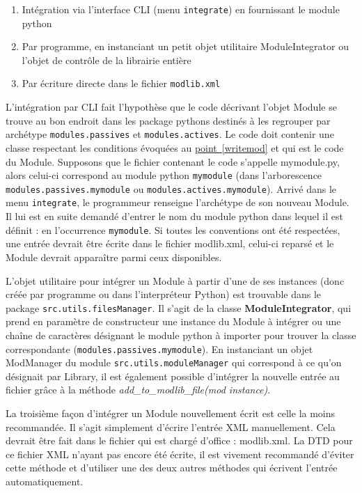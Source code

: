 \documentclass[]{article}
\newcommand{\wordlink}[2]{\hyperref[#1]{#2~\ref{#1}}}
\begin{document}
\begin{enumerate}
\item Intégration via l'interface CLI (menu \texttt{integrate}) en fournissant le module python
\item Par programme, en instanciant un petit objet utilitaire ModuleIntegrator ou l'objet de contrôle de la librairie entière
\item Par écriture directe dans le fichier \texttt{modlib.xml}
\end{enumerate}

\par L'intégration par CLI fait l'hypothèse que le code décrivant l'objet Module se trouve au bon endroit dans les package pythons destinés à les regrouper par archétype \texttt{modules.passives} et \texttt{modules.actives}. Le code doit contenir une classe respectant les conditions évoquées au \wordlink{writemod}{point} et qui est le code du Module. Supposons que le fichier contenant le code s'appelle mymodule.py, alors celui-ci correspond au module python \texttt{mymodule} (dans l'arborescence \texttt{modules.passives.mymodule} ou \texttt{modules.actives.mymodule}). Arrivé dans le menu \texttt{integrate}, le programmeur renseigne l'archétype de son nouveau Module. Il lui est en suite demandé d'entrer le nom du module python dans lequel il est définit : en l'occurrence \texttt{mymodule}. Si toutes les conventions ont été respectées, une entrée devrait être écrite dans le fichier modlib.xml, celui-ci reparsé et le Module devrait apparaître parmi ceux disponibles.\\

\par L'objet utilitaire pour intégrer un Module à partir d'une de ses instances (donc créée par programme ou dans l'interpréteur Python) est trouvable dans le package \texttt{src.utils.filesManager}. Il s'agit de la classe \textbf{ModuleIntegrator}, qui prend en paramètre de constructeur une instance du Module à intégrer ou une chaîne de caractères désignant le module python à importer pour trouver la classe correspondante (\texttt{modules.passives.mymodule}). En instanciant un objet ModManager du module \texttt{src.utils.moduleManager} qui correspond à ce qu'on désignait par Library, il est également possible d'intégrer la nouvelle entrée au fichier grâce à la méthode \textit{add\_to\_modlib\_file(mod instance)}.\\

\par La troisième façon d'intégrer un Module nouvellement écrit est celle la moins recommandée. Il s'agit simplement d'écrire l'entrée XML manuellement. Cela devrait être fait dans le fichier qui est chargé d'office : modlib.xml. La DTD pour ce fichier XML n'ayant pas encore été écrite, il est vivement recommandé d'éviter cette méthode et d'utiliser une des deux autres méthodes qui écrivent l'entrée automatiquement.
\end{document}
